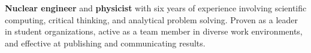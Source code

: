 

\normalsize
\begin{justify}
\textbf{Nuclear engineer} and \textbf{physicist} with six years of experience involving scientific computing, critical thinking, and analytical problem solving.
Proven as a leader in student organizations, active as a team member in diverse work environments, and effective at publishing and communicating results.
\end{justify}

